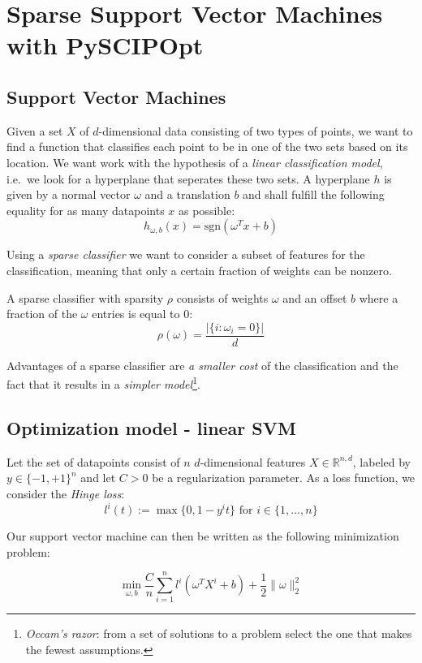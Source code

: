 \documentclass[11pt]{article}
\newcommand\abs[1]{\left|#1\right|}
\newcommand{\R}{\mathbb{R}}
\begin{document}
\section*{Sparse Support Vector Machines with PySCIPOpt}

\subsection*{Support Vector Machines}

Given a set $X$ of $d$-dimensional data consisting of two types of points, we want to find a function that classifies each point to be in one of the two sets based on its location.
We want work with the hypothesis of a \emph{linear classification model}, i.e.\ we look for a hyperplane that seperates these two sets.
A hyperplane $h$ is given by a normal vector $\omega$ and a translation $b$ and shall fulfill the following equality for as many datapoints $x$ as possible:
$$ h_{\omega, b}(x) = \text{sgn} (\omega^{T}x + b) $$

Using a \emph{sparse classifier} we want to consider a subset of features for the classification, meaning that only a certain fraction of weights can be nonzero.

A sparse classifier with sparsity $\rho$ consists of weights $\omega$ and an offset $b$ where a fraction of the $\omega$ entries is equal to 0:
$$ \rho(\omega) = \frac{\abs{\{ i \colon \omega_{i} = 0 \}}}{d} $$

Advantages of a sparse classifier are \emph{a smaller cost} of the classification and the fact that it results in a \emph{simpler model}\footnote{\emph{Occam's razor}: from a set of solutions to a problem select the one that makes the fewest assumptions.}.

\subsection*{Optimization model - linear SVM}

Let the set of datapoints consist of $n$ $d$-dimensional features $X \in \R^{n,d}$, labeled by $y \in \{-1,+1\}^{n}$ and let $C > 0$ be a regularization parameter.
As a loss function, we consider the \emph{Hinge loss}:
$$l^{i}(t) :=  \max \{0, 1 - y^i t\} \text{ for } i \in \{1,\dots, n\}$$

Our support vector machine can then be written as the following minimization problem:

$$
\min\limits_{\omega, b}
\frac{C}{n} \sum\limits_{i = 1}^{n} l^i(\omega^{T}X^{i} + b)
+\frac{1}{2} \lVert \omega \rVert_{2}^{2}
$$
\end{document}
